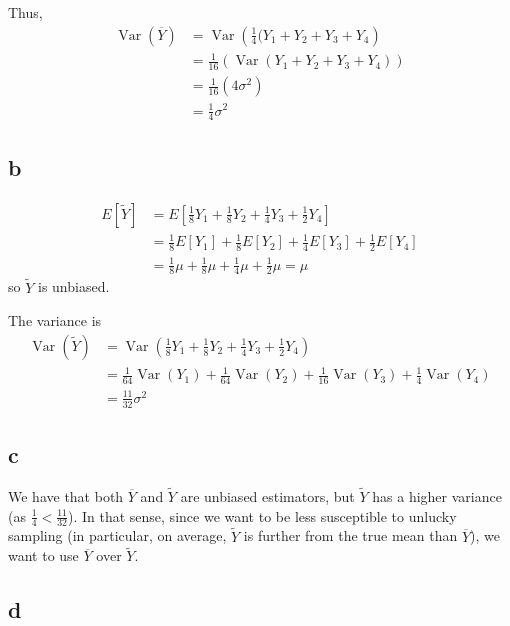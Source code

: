 \documentclass[12pt,letterpaper]{article}
\theoremstyle{definition}
\DeclareMathOperator{\Var}{Var}
\begin{document}
Thus, 
\begin{align*}
  \Var(\overline{Y}) &= \Var\left(\frac{1}{4}(Y_1 + Y_2 + Y_3 + Y_4\right) \\
                     &= \frac{1}{16}(\Var(Y_1 + Y_2 + Y_3 + Y_4)) \\
                     &= \frac{1}{16}(4\sigma^2) \\
                     &= \frac{1}{4}\sigma^2
\end{align*}

\subsection*{b}

\begin{align*}
  E[\widetilde{Y}] &= E\left[\frac{1}{8}Y_1 + \frac{1}{8}Y_2 + \frac{1}{4} Y_3 + \frac{1}{2}Y_4\right] \\
                   &= \frac{1}{8}E[Y_1] + \frac{1}{8}E[Y_2] + \frac{1}{4}E[Y_3] + \frac{1}{2}E[Y_4] \\
                   &= \frac{1}{8}\mu + \frac{1}{8}\mu + \frac{1}{4}\mu + \frac{1}{2}\mu = \mu
\end{align*}
so $\widetilde{Y}$ is unbiased.

The variance is
\begin{align*}
  \Var(\widetilde{Y}) &= \Var\left(\frac{1}{8}Y_1 + \frac{1}{8}Y_2 + \frac{1}{4} Y_3 + \frac{1}{2}Y_4\right) \\
                     &= \frac{1}{64}\Var(Y_1) + \frac{1}{64}\Var(Y_2) + \frac{1}{16} \Var(Y_3) + \frac{1}{4}\Var(Y_4) \\
                     &= \frac{11}{32}\sigma^2
\end{align*}

\subsection*{c}

We have that both $\overline{Y}$ and $\widetilde{Y}$ are unbiased estimators, but $\widetilde{Y}$ has a higher variance (as $\frac{1}{4} < \frac{11}{32}$). In that sense, since we want to be less susceptible to unlucky sampling (in particular, on average, $\widetilde{Y}$ is further from the true mean than $\overline{Y}$), we want to use $\overline{Y}$ over $\widetilde{Y}$. 

\subsection*{d}
\end{document}
